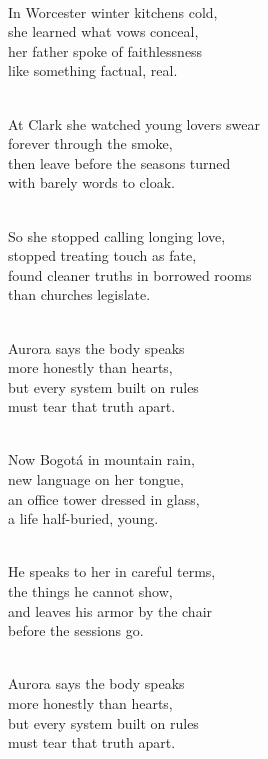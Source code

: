 \begin{lyrics}

\\
In Worcester winter kitchens cold,\\
she learned what vows conceal,\\
her father spoke of faithlessness\\
like something factual, real.

\\
At Clark she watched young lovers swear\\
forever through the smoke,\\
then leave before the seasons turned\\
with barely words to cloak.

\\
So she stopped calling longing love,\\
stopped treating touch as fate,\\
found cleaner truths in borrowed rooms\\
than churches legislate.

\\
Aurora says the body speaks\\
more honestly than hearts,\\
but every system built on rules\\
must tear that truth apart.

\\
Now Bogotá in mountain rain,\\
new language on her tongue,\\
an office tower dressed in glass,\\
a life half-buried, young.

\\
He speaks to her in careful terms,\\
the things he cannot show,\\
and leaves his armor by the chair\\
before the sessions go.

\\
Aurora says the body speaks\\
more honestly than hearts,\\
but every system built on rules\\
must tear that truth apart.


\end{lyrics}

